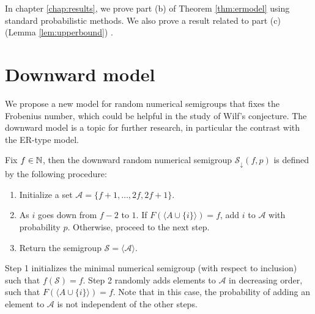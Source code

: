 In chapter \ref{chap:results}, we prove part (b) of Theorem \ref{thm:ermodel} using standard probabilistic methods. We also prove a result related to part (c) (Lemma \ref{lem:upperbound}) .

\section{Downward model}\label{sec:contrib1:theme2}

We propose a new model for random numerical semigroups that fixes the Frobenius number, which could be helpful in the study of Wilf's conjecture. The downward model is a topic for further research, in particular the contrast with the ER-type model. \par

\begin{definition} Fix $f \in \mathbb{N}$, then the downward random numerical semigroup $\mathcal{S}_\downarrow(f, p)$ is defined by the following procedure: 
\begin{enumerate}
    \item Initialize a set $\mathcal{A} = \{f + 1, \ldots, 2f, 2f + 1\}$.
    \item As $i$ goes down from $f - 2$ to $1$. If $F(\langle A \cup \{i\} \rangle) = f$, add $i$ to $\mathcal{A}$ with probability $p$. Otherwise, proceed to the next step.
    \item Return the semigroup $\mathcal{S} = \langle\mathcal{A}\rangle$.
\end{enumerate}
Step 1 initializes the minimal numerical semigroup (with respect to inclusion) such that $f(\mathcal{S}) = f$. Step 2 randomly adds elements to $\mathcal{A}$ in decreasing order, such that $F(\langle A \cup \{i\} \rangle) = f$. Note that in this case, the probability of adding an element to $\mathcal{A}$ is not independent of the other steps. 
    
\end{definition}

